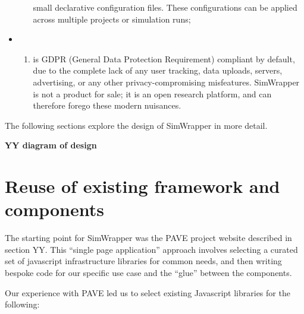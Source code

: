 \begin{itemize}
\begin{enumerate}
    small declarative configuration files. These configurations can be
    applied across multiple projects or simulation runs;
  \end{enumerate}
\item
  \begin{enumerate}
  \def\labelenumi{(\arabic{enumi})}
  \setcounter{enumi}{5}
  \item
    is GDPR (General Data Protection Requirement) compliant by default,
    due to the complete lack of any user tracking, data uploads,
    servers, advertising, or any other privacy-compromising misfeatures.
    SimWrapper is not a product for sale; it is an open research
    platform, and can therefore forego these modern nuisances.
  \end{enumerate}
\end{itemize}

The following sections explore the design of SimWrapper in more detail.

\textbf{YY diagram of design}


\hypertarget{reuse-of-existing-framework-and-components}{%
\section{Reuse of existing framework and
components}\label{reuse-of-existing-framework-and-components}}

The starting point for SimWrapper was the PAVE project website described
in section YY. This ``single page application'' approach involves
selecting a curated set of javascript infrastructure libraries for
common needs, and then writing bespoke code for our specific use case
and the ``glue'' between the components.

Our experience with PAVE led us to select existing Javascript libraries
for the following:

